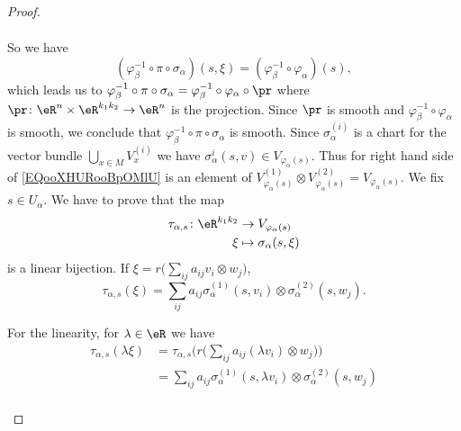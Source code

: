 \begin{proof}
\begin{subproof}
\begin{subequations}
\begin{align}
			\end{align}
		\end{subequations}
		So we have
		\begin{equation}
			(\varphi_{\beta}^{-1}\circ\pi\circ\sigma_{\alpha})(s,\xi)=(\varphi_{\beta}^{-1}\circ\varphi_{\alpha})(s),
		\end{equation}
		which leads us to \( \varphi_{\beta}^{-1}\circ\pi\circ\sigma_{\alpha}=\varphi_{\beta}^{-1}\circ\varphi_{\alpha}\circ\pr\) where \(\pr \colon \eR^n\times \eR^{k_1k_2}\to \eR^n  \) is the projection. Since \( \pr\) is smooth and \( \varphi_{\beta}^{-1}\circ\varphi_{\alpha}\) is smooth, we conclude that \( \varphi_{\beta}^{-1}\circ\pi\circ\sigma_{\alpha}\) is smooth.
		Since \( \sigma_{\alpha}^{(i)}\) is a chart for the vector bundle \( \bigcup_{x\in M}V_x^{(i)}\) we have \( \sigma_{\alpha}^{i}(s,v)\in V_{\varphi_{\alpha}(s)}\). Thus for right hand side of \eqref{EQooXHURooBpOMlU} is an element of \( V_{\varphi_{\alpha}(s)}^{(1)}\otimes V_{\varphi_{\alpha}(s)}^{(2)}=V_{\varphi_{\alpha}(s)}\).
		We fix \( s\in U_{\alpha}\). We have to prove that the map
		\begin{equation}
			\begin{aligned}
				\tau_{\alpha,s}\colon \eR^{k_1k_2} & \to V_{\varphi_{\alpha}(s)}    \\
				\xi                                & \mapsto \sigma_{\alpha}(s,\xi)
			\end{aligned}
		\end{equation}
		is a linear bijection. If \( \xi=r\big( \sum_{ij}a_{ij}v_i\otimes w_j \big)\),
		\begin{equation}
			\tau_{\alpha,s}(\xi)=\sum_{ij}a_{ij}\sigma_{\alpha}^{(1)}(s,v_i)\otimes \sigma_{\alpha}^{(2)}(s,w_j).
		\end{equation}
		\begin{subproof}
			\spitem[Linear]
			For the linearity, for \( \lambda\in \eR\) we have
			\begin{subequations}
				\begin{align}
					\tau_{\alpha,s}(\lambda\xi) & =\tau_{\alpha,s}\Big( r\big( \sum_{ij}a_{ij}(\lambda v_i)\otimes w_j \big) \Big)         \\
					                            & =\sum_{ij}a_{ij}\sigma_{\alpha}^{(1)}(s,\lambda v_i)\otimes \sigma_{\alpha}^{(2)}(s,w_j) \\

\end{align}
\end{subequations}
\end{subproof}
\end{subproof}
\end{proof}
